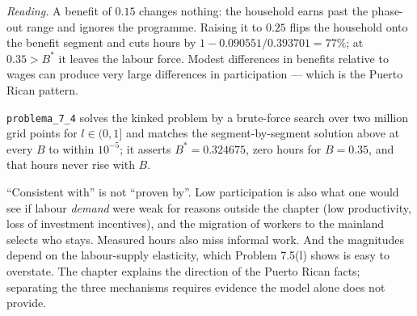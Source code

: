 \documentclass[12pt, letterpaper]{article}
\begin{document}
\begin{tcolorbox}[evenbox,title={Problem 7.4 \quad Puerto Rico}]
\emph{Reading.} A benefit of $0.15$ changes nothing: the household earns past the phase-out
range and ignores the programme. Raising it to $0.25$ flips the household onto the benefit
segment and cuts hours by $1-0.090551/0.393701=77\%$; at $0.35>B^*$ it leaves the labour force.
Modest differences in benefits relative to wages can produce very large differences in
participation --- which is the Puerto Rican pattern.

\begin{tcolorbox}[databox]
\texttt{problema\_7\_4} solves the kinked problem by a brute-force search over two million
grid points for $l\in(0,1]$ and matches the segment-by-segment solution above at every $B$ to
within $10^{-5}$; it asserts $B^*=0.324675$, zero hours for $B=0.35$, and that hours never
rise with $B$. \checkmark
\end{tcolorbox}

\begin{tcolorbox}[trapbox]
``Consistent with'' is not ``proven by''. Low participation is also what one would see if
labour \emph{demand} were weak for reasons outside the chapter (low productivity, loss of
investment incentives), and the migration of workers to the mainland selects who stays.
Measured hours also miss informal work. And the magnitudes depend on the labour-supply
elasticity, which Problem 7.5(l) shows is easy to overstate. The chapter explains the
direction of the Puerto Rican facts; separating the three mechanisms requires evidence the
model alone does not provide.
\end{tcolorbox}
\end{tcolorbox}
\end{document}
